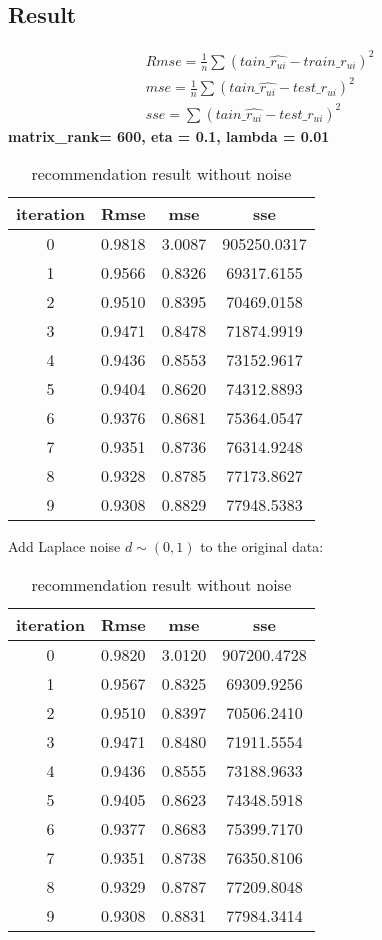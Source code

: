 \documentclass[]{article}
\begin{document}
\subsection{Result}
\begin{equation}
\begin{split}
Rmse = \frac{1}{n}\sum(tain\_\hat{r_{ui}}-train\_r_{ui})^2\\
mse = \frac{1}{n}\sum(tain\_\hat{r_{ui}}-test\_r_{ui})^2\\
sse = \sum(tain\_\hat{r_{ui}}-test\_r_{ui})^2 
\end{split}
\end{equation}
\textbf{matrix\_rank= 600, eta = 0.1, lambda = 0.01}
\begin{table}[H]
	\centering
	\caption{recommendation result without noise}
	\begin{tabular}{|c|c|c|c|}
		\hline 
		iteration & Rmse&mse&sse  \\ \hline
		0 & 0.9818 & 3.0087 & 905250.0317 \\ \hline
		1 & 0.9566 & 0.8326 & 69317.6155 \\ \hline
		2 & 0.9510 & 0.8395 & 70469.0158 \\ \hline
		3 & 0.9471 & 0.8478 & 71874.9919 \\ \hline
		4 & 0.9436 & 0.8553 & 73152.9617 \\ \hline
		5 & 0.9404 & 0.8620 & 74312.8893 \\ \hline
		6 & 0.9376 & 0.8681 & 75364.0547 \\ \hline
		7 & 0.9351 & 0.8736 & 76314.9248 \\ \hline
		8 & 0.9328 & 0.8785 & 77173.8627 \\ \hline
		9 & 0.9308 & 0.8829 & 77948.5383 \\ \hline
	\end{tabular}
\end{table}
Add Laplace noise $d\sim (0, 1)$ to the original data:
 \begin{table}[H]
 	\centering
 	\caption{recommendation result without noise}
 	\begin{tabular}{|c|c|c|c|}
 		\hline 
 		iteration & Rmse&mse&sse  \\ \hline
 		0 & 0.9820 & 3.0120 & 907200.4728 \\ \hline
 		1 & 0.9567 & 0.8325 & 69309.9256 \\ \hline
 		2 & 0.9510 & 0.8397 & 70506.2410 \\ \hline
 		3 & 0.9471 & 0.8480 & 71911.5554 \\ \hline
 		4 & 0.9436 & 0.8555 & 73188.9633 \\ \hline
 		5 & 0.9405 & 0.8623 & 74348.5918 \\ \hline
 		6 & 0.9377 & 0.8683 & 75399.7170 \\ \hline
 		7 & 0.9351 & 0.8738 & 76350.8106 \\ \hline
 		8 & 0.9329 & 0.8787 & 77209.8048 \\ \hline
 		9 & 0.9308 & 0.8831 & 77984.3414 \\ \hline
 	\end{tabular}
 \end{table}
\end{document}
